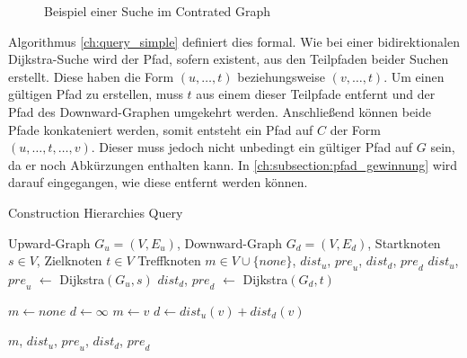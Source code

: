 \begin{figure}[ht]
  \centering
  \caption{Beispiel einer Suche im Contrated Graph}
  \label{fig:ch:beispiel_suche}
\end{figure}

Algorithmus \ref{ch:query_simple} definiert dies formal.
Wie bei einer bidirektionalen Dijkstra-Suche wird der Pfad, sofern existent, aus den Teilpfaden beider Suchen erstellt.
Diese haben die Form $(u, \dotsc, t)$ beziehungsweise $(v, \dotsc, t)$.
Um einen gültigen Pfad zu erstellen, muss $t$ aus einem dieser Teilpfade entfernt und der Pfad des Downward-Graphen umgekehrt werden.
Anschließend können beide Pfade konkateniert werden, somit entsteht ein Pfad auf $C$ der Form $(u, \dotsc, t, \dotsc, v)$.
Dieser muss jedoch nicht unbedingt ein gültiger Pfad auf $G$ sein, da er noch Abkürzungen enthalten kann.
In \autoref{ch:subsection:pfad_gewinnung} wird darauf eingegangen, wie diese entfernt werden können.

\begin{algorithm}[ht]
  \caption{Construction Hierarchies Query}
  \begin{algorithmic}[1]
    \Require Upward-Graph $G_u = (V, E_u)$, Downward-Graph $G_d = (V, E_d)$, Startknoten $s \in V$, Zielknoten $t \in V$
    \Ensure Treffknoten $m \in V \cup \{ {none} \}$, ${dist}_u$, ${pre}_u$, ${dist}_d$, ${pre}_d$
    \State ${dist}_u$, ${pre}_u$ $\leftarrow$ Dijkstra$(G_u, s)$
    \State ${dist}_d$, ${pre}_d$ $\leftarrow$ Dijkstra$(G_d, t)$

    \State
    \State $m \leftarrow {none}$
    \State $d \leftarrow \infty$
    \State
    \State $m \leftarrow v$
    \State $d \leftarrow {dist}_u(v) + {dist}_d(v)$
    \EndIf
    \EndFor

    \State
    \State \Return $m$, ${dist}_u$, ${pre}_u$, ${dist}_d$, ${pre}_d$
  \end{algorithmic}
  \label{ch:query_simple}
\end{algorithm}

